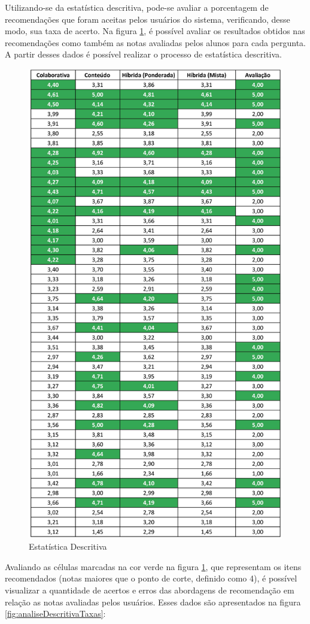 Utilizando-se da estatística descritiva, pode-se avaliar a porcentagem de recomendações que foram aceitas pelos usuários do sistema, verificando, desse modo, sua taxa de acerto. Na figura \ref{fig:analiseDescritiva}, é possível avaliar os resultados obtidos nas recomendações como também as notas avaliadas pelos alunos para cada pergunta. A partir desses dados é possível realizar o processo de estatística descritiva.

\begin{figure}[H]
	\centering
	\includegraphics[width=0.8\linewidth]{imagens/estatisticaDescritiva.jpg}
	\caption[Estatística Descritiva]{Estatística Descritiva}
    \label{fig:analiseDescritiva}
\end{figure}

Avaliando as células marcadas na cor verde na figura \ref{fig:analiseDescritiva}, que representam os itens recomendados (notas maiores que o ponto de corte, definido como 4), é possível visualizar a quantidade de acertos e erros das abordagens de recomendação em relação as notas avaliadas pelos usuários. Esses dados são apresentados na figura \ref{fig:analiseDescritivaTaxas}:

